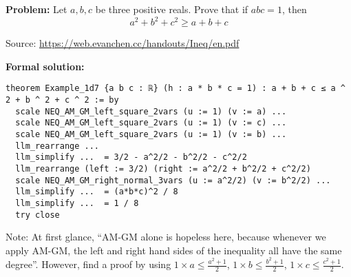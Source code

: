 \begin{tcolorbox}[breakable, enhanced, colback=black!5!white, colframe=black!75!white, title=A Different Proof Generated by \name (1)]

\textbf{Problem:} 
Let $a, b, c$ be three positive reals. Prove that if $abc = 1$, then
\begin{equation*}
a ^ 2 + b ^ 2 + c ^ 2 \ge a + b + c
\end{equation*}

Source: {\small\url{https://web.evanchen.cc/handouts/Ineq/en.pdf}}

\tcbline

\textbf{Formal solution:}
\begin{lstlisting}
theorem Example_1d7 {a b c : ℝ} (h : a * b * c = 1) : a + b + c ≤ a ^ 2 + b ^ 2 + c ^ 2 := by
  scale NEQ_AM_GM_left_square_2vars (u := 1) (v := a) ...
  scale NEQ_AM_GM_left_square_2vars (u := 1) (v := c) ...
  scale NEQ_AM_GM_left_square_2vars (u := 1) (v := b) ...
  llm_rearrange ...
  llm_simplify ...  = 3/2 - a^2/2 - b^2/2 - c^2/2
  llm_rearrange (left := 3/2) (right := a^2/2 + b^2/2 + c^2/2)
  scale NEQ_AM_GM_right_normal_3vars (u := a^2/2) (v := b^2/2) ...
  llm_simplify ...  = (a*b*c)^2 / 8
  llm_simplify ...  = 1 / 8
  try close
\end{lstlisting}

{Note: At first glance, ``AM-GM alone is hopeless here, because whenever we apply AM-GM, the left and right hand sides of the inequality all have the same degree''. However, \name find a proof by using $1 \times a \leq \frac{a^2+1}{2}$, $1 \times b \leq \frac{b^2+1}{2}$, $1 \times c \leq \frac{c^2+1}{2}$}.
\end{tcolorbox}

\vspace{2em}

